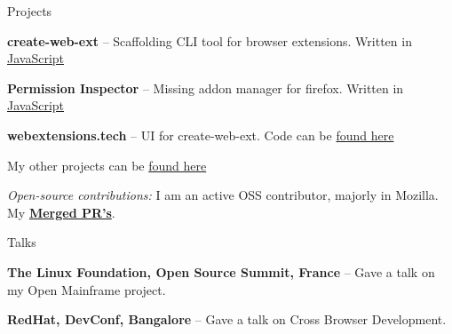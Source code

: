 \documentclass{resume} %
\begin{document}

\begin{rSection}{Projects}
  \begin{rProjectSection}
    \item \textbf {create-web-ext} -- Scaffolding CLI tool for browser extensions. Written in \href{https://github.com/web-ext-labs/create-web-ext}{JavaScript}
    \item \textbf {Permission Inspector} --   Missing addon manager for firefox. Written in \href{https://github.com/tsl143/addonManager}{JavaScript}
    \item \textbf {webextensions.tech} -- UI for create-web-ext. Code can be \href{https://github.com/web-ext-labs/ui-tool}{found here}
    \item My other projects can be \href{hhttps://championshuttler.com/#projects/}{found here}
  \end{rProjectSection}

  \begin{rBlurbSection}
    \item {\em Open-source contributions:}
      I am an active OSS contributor, majorly in Mozilla. My \href{https://github.com/issues?q=is%3Apr+author%3Achampionshuttler}{\textbf{Merged PR's}}.
  \end{rBlurbSection}
\end{rSection}


\begin{rSection}{Talks}
  \begin{rProjectSection}
    \item \textbf {The Linux Foundation, Open Source Summit, France} -- Gave a talk on my Open Mainframe project.
  \end{rProjectSection}
  \begin{rProjectSection}
    \item \textbf {RedHat, DevConf, Bangalore} -- Gave a talk on Cross Browser Development.
  \end{rProjectSection}
\end{rSection}

\end{document}
